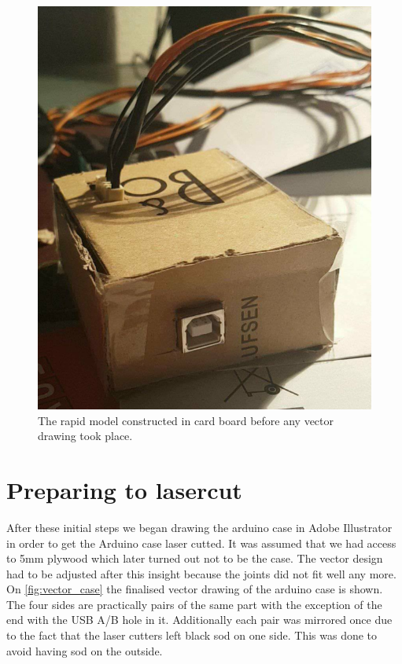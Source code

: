 \begin{figure}[H]
\centering
\includegraphics[scale=0.75]{Figure/rapid_model.png}
\caption{The rapid model constructed in card board before any vector drawing took place.}
\label{fig:rapid_model}
\end{figure}
\pagebreak

\section{Preparing to lasercut}
After these initial steps we began drawing the arduino case in Adobe Illustrator in order to get the Arduino case laser cutted.  It was assumed that we had access to 5mm plywood which later turned out not to be the case. The vector design had to be adjusted after this insight because the joints did not fit well any more. On \autoref{fig:vector_case} the finalised vector drawing of the arduino case is shown. The four sides are practically pairs of the same part with the exception of the end with the USB A/B hole in it. Additionally each pair was mirrored once due to the fact that the laser cutters left black sod on one side. This was done to avoid having sod on the outside.

